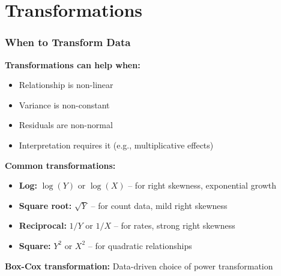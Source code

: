 \documentclass{beamer}
\begin{document}
\section{Transformations}

\begin{frame}
\frametitle{When to Transform Data}
\textbf{Transformations can help when:}
\begin{itemize}
\item Relationship is non-linear
\item Variance is non-constant
\item Residuals are non-normal
\item Interpretation requires it (e.g., multiplicative effects)
\end{itemize}

\vspace{0.5cm}
\textbf{Common transformations:}
\begin{itemize}
\item \textbf{Log:} $\log(Y)$ or $\log(X)$ -- for right skewness, exponential growth
\item \textbf{Square root:} $\sqrt{Y}$ -- for count data, mild right skewness
\item \textbf{Reciprocal:} $1/Y$ or $1/X$ -- for rates, strong right skewness
\item \textbf{Square:} $Y^2$ or $X^2$ -- for quadratic relationships
\end{itemize}

\vspace{0.3cm}
\textbf{Box-Cox transformation:} Data-driven choice of power transformation
\end{frame}
\end{document}
